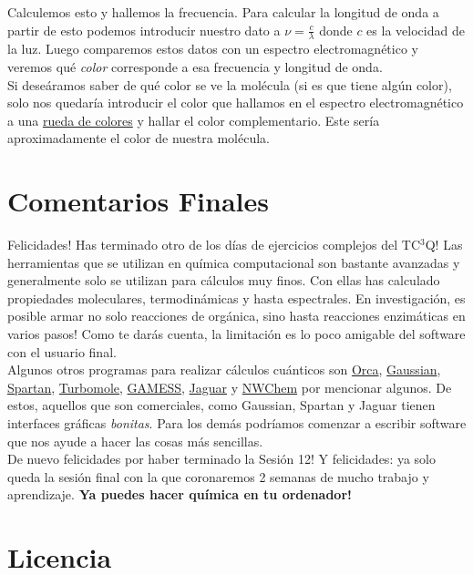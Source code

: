 \documentclass[10pt,letterpaper]{article}
\begin{document}
Calculemos esto y hallemos la frecuencia. Para calcular la longitud de onda a partir de esto podemos introducir nuestro dato a $\nu = \frac{c}{\lambda}$ donde $c$ es la velocidad de la luz. Luego comparemos estos datos con un espectro electromagn\'etico y veremos qu\'e \emph{color} corresponde a esa frecuencia y longitud de onda.\\

Si dese\'aramos saber de qu\'e color se ve la mol\'ecula (si es que tiene alg\'un color), solo nos quedar\'ia introducir el color que hallamos en el espectro electromagn\'etico a una \href{http://paletton.com/}{rueda de colores} y hallar el color complementario. Este ser\'ia aproximadamente el color de nuestra mol\'ecula.

\section{Comentarios Finales}
Felicidades! Has terminado otro de los d\'ias de ejercicios complejos del TC$^3$Q! Las herramientas que se utilizan en qu\'imica computacional son bastante avanzadas y generalmente solo se utilizan para c\'alculos muy finos. Con ellas has calculado propiedades moleculares, termodin\'amicas y hasta espectrales. En investigaci\'on, es posible armar no solo reacciones de org\'anica, sino hasta reacciones enzim\'aticas en varios pasos! Como te dar\'as cuenta, la limitaci\'on es lo poco amigable del software con el usuario final.\\

Algunos otros programas para realizar c\'alculos cu\'anticos son \href{https://orcaforum.cec.mpg.de/}{Orca}, \href{http://gaussian.com/}{Gaussian}, \href{https://www.wavefun.com/products/spartan.html}{Spartan}, \href{}{Turbomole}, \href{http://www.msg.ameslab.gov/gamess/}{GAMESS}, \href{https://www.schrodinger.com/jaguar}{Jaguar} y \href{http://www.nwchem-sw.org/index.php/Main_Page}{NWChem} por mencionar algunos. De estos, aquellos que son comerciales, como Gaussian, Spartan y Jaguar tienen interfaces gr\'aficas \emph{bonitas}. Para los dem\'as podr\'iamos comenzar a escribir software que nos ayude a hacer las cosas m\'as sencillas.\\

De nuevo felicidades por haber terminado la Sesi\'on 12! Y felicidades: ya solo queda la sesi\'on final con la que coronaremos 2 semanas de mucho trabajo y aprendizaje. \textbf{Ya puedes hacer qu\'imica en tu ordenador!}


\section*{Licencia}
\end{document}
